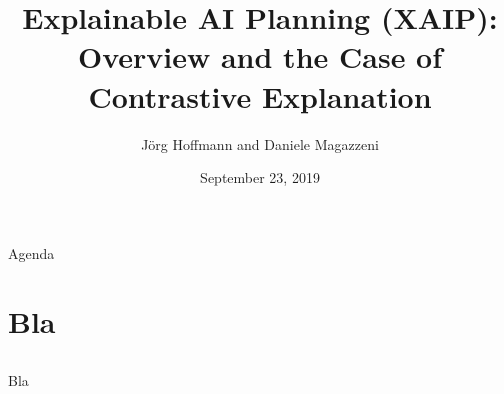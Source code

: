 \title[Explainable AI Planning]{Explainable AI Planning (XAIP): Overview and the Case of Contrastive Explanation}

\author[Hoffmann and Magazzeni]{J\"org Hoffmann and Daniele Magazzeni}


\date{September 23, 2019}





\frame{\titlepage}

\begin{frame}{Agenda}
\tableofcontents
\end{frame}




\section[Bla]{Bla}
\subsection*{}

\begin{frame}{Bla}

\end{frame}





